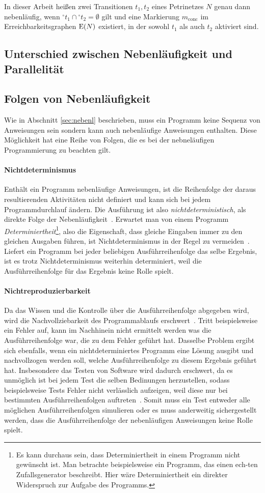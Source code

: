 In dieser Arbeit heißen zwei Transitionen $t_1, t_2$ eines Petrinetzes $N$ genau dann nebenläufig, wenn ${}^\circ t_1 \cap {}^\circ t_2 = \emptyset$ gilt und eine Markierung $m_\text{conc}$ im Erreichbarkeitsgraphen $\operatorname{E}(N)$ existiert, in der sowohl $t_1$ als auch $t_2$ aktiviert sind.

\subsection{Unterschied zwischen Nebenläufigkeit und Parallelität}

\subsection{Folgen von Nebenläufigkeit}
Wie in Abschnitt \ref{sec:nebenl} beschrieben, muss ein Programm keine Sequenz von Anweisungen sein sondern kann auch nebenläufige Anweisungen enthalten. Diese Möglichkeit hat eine Reihe von Folgen, die es bei der nebneläufigen Programmierung zu beachten gilt.
\paragraph{Nichtdeterminismus}
Enthält ein Programm nebenläufige Anweisungen, ist die Reihenfolge der daraus resultierenden Aktivitäten nicht definiert und kann sich bei jedem Programmdurchlauf ändern. Die Ausführung ist also \emph{nichtdeterministisch}, als direkte Folge der Nebenläufigkeit~\cite{Herrtwich1989}. Erwartet man von einem Programm \emph{Determiniertheit}\footnote{Es kann durchaus sein, dass Determiniertheit in einem Programm nicht gewünscht ist. Man betrachte beispielsweise ein Programm, das einen ech-ten Zufallsgenerator beschreibt. Hier wäre Determiniertheit ein direkter Widerspruch zur Aufgabe des Programms.}, also die Eigenschaft, dass gleiche Eingaben immer zu den gleichen Ausgaben führen, ist Nichtdeterminismus in der Regel zu vermeiden~\cite{Herrtwich1989}. Liefert ein Programm bei jeder beliebigen Ausführreihenfolge das selbe Ergebnis, ist es trotz Nichtdeterminismus weiterhin determiniert, weil die Ausführreihenfolge für das Ergebnis keine Rolle spielt. 
\paragraph{Nichtreproduzierbarkeit}
Da das Wissen und die Kontrolle über die Ausführreihenfolge abgegeben wird, wird die Nachvollziebarkeit des Programmablaufs erschwert~\cite{Herrtwich1989}. Tritt beispielsweise ein Fehler auf, kann im Nachhinein nicht ermittelt werden was die Ausführreihenfolge war, die zu dem Fehler geführt hat. Dasselbe Problem ergibt sich ebenfalls, wenn ein nichtdeterminiertes Programm eine Lösung ausgibt und nachvollzogen werden soll, welche Ausführreihenfolge zu diesem Ergebnis geführt hat. Insbesondere das Testen von Software wird dadurch erschwert, da es unmöglich ist bei jedem Test die selben Bedinungen herzustellen, sodass beispielsweise Tests Fehler nicht verlässlich aufzeigen, weil diese nur bei bestimmten Ausführreihenfolgen auftreten~\cite{Herrtwich1989}. Somit muss ein Test entweder alle möglichen Ausführreihenfolgen simulieren oder es muss anderweitig sichergestellt werden, dass die Ausführreihenfolge der nebenläufigen Anweisungen keine Rolle spielt.
